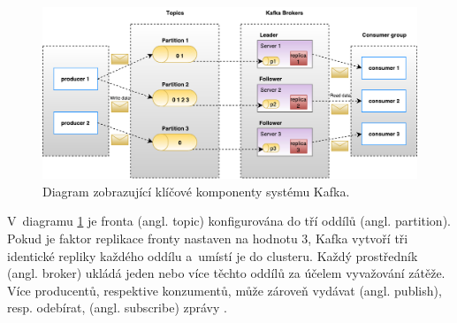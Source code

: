 \begin{figure}[!h]
  \centering
  \includegraphics[width=15cm]{template-fig/Kafka_architecture.pdf}
  \caption{Diagram zobrazující klíčové komponenty systému Kafka. \cite{kafkaTutorialsPoint}}
  \label{FIG_KafkaArchitecture}
\end{figure}

\noindent V~diagramu \ref{FIG_KafkaArchitecture} je fronta (angl. topic) konfigurována do tří oddílů (angl. partition). Pokud je faktor replikace fronty nastaven na hodnotu 3, Kafka vytvoří tři identické repliky každého oddílu a~umístí je do clusteru. Každý prostředník (angl. broker) ukládá jeden nebo více těchto oddílů za účelem vyvažování zátěže. Více producentů, respektive konzumentů, může zároveň vydávat (angl. publish), resp. odebírat, (angl. subscribe) zprávy \cite{kafkaTutorialsPoint}.

